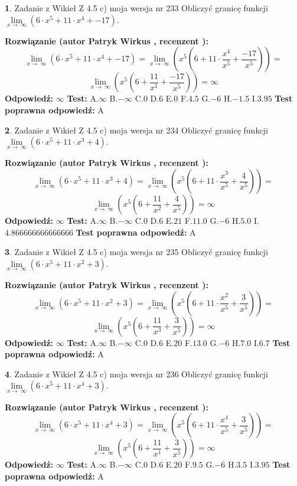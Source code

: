 \documentclass[12pt, a4paper]{article}
\theoremstyle{definition} %
\newtheorem{zad}{}
\newcommand{\zadStart}[1]{\begin{zad}#1\newline}
\newcommand{\zadStop}{\end{zad}}
\newcommand{\rozwStart}[2]{\noindent \textbf{Rozwiązanie (autor #1 , recenzent #2): }\newline}
\newcommand{\rozwStop}{\newline}
\newcommand{\odpStart}{\noindent \textbf{Odpowiedź:}\newline}
\newcommand{\odpStop}{\newline}
\newcommand{\testStart}{\noindent \textbf{Test:}\newline}
\newcommand{\testStop}{\newline}
\newcommand{\kluczStart}{\noindent \textbf{Test poprawna odpowiedź:}\newline}
\newcommand{\kluczStop}{\newline}
\begin{document}
\zadStart{Zadanie z Wikieł Z 4.5 c) moja wersja nr 233}
Obliczyć granicę funkcji  $\lim\limits_{x\to\ \infty}(6 \cdot x^{5}+11 \cdot x^{4}+-17)$.
\zadStop
\rozwStart{Patryk Wirkus}{}
$$\lim\limits_{x\to\ \infty}(6 \cdot x^{5}+11 \cdot x^{4}+-17) = \lim\limits_{x\to\ \infty}(x^{5}(6 +11 \cdot \frac{x^{4}}{x^{5}}+\frac{-17}{x^{5}})) =$$ $$\lim\limits_{x\to\ \infty}(x^{5}(6 +\frac{11}{x^{1}}+\frac{-17}{x^{5}})) =\infty$$
\rozwStop
\odpStart
$\infty$
\odpStop
\testStart
A.$\infty$ B.$-\infty$ C.$0$ D.$6$ E.$0$
F.$4.5$ G.$-6$
H.$-1.5$
I.$3.95$
\testStop
\kluczStart
A
\kluczStop



\zadStart{Zadanie z Wikieł Z 4.5 c) moja wersja nr 234}
Obliczyć granicę funkcji  $\lim\limits_{x\to\ \infty}(6 \cdot x^{5}+11 \cdot x^{3}+4)$.
\zadStop
\rozwStart{Patryk Wirkus}{}
$$\lim\limits_{x\to\ \infty}(6 \cdot x^{5}+11 \cdot x^{3}+4) = \lim\limits_{x\to\ \infty}(x^{5}(6 +11 \cdot \frac{x^{3}}{x^{5}}+\frac{4}{x^{5}})) =$$ $$\lim\limits_{x\to\ \infty}(x^{5}(6 +\frac{11}{x^{2}}+\frac{4}{x^{5}})) =\infty$$
\rozwStop
\odpStart
$\infty$
\odpStop
\testStart
A.$\infty$ B.$-\infty$ C.$0$ D.$6$ E.$21$
F.$11.0$ G.$-6$
H.$5.0$
I.$4.866666666666666$
\testStop
\kluczStart
A
\kluczStop



\zadStart{Zadanie z Wikieł Z 4.5 c) moja wersja nr 235}
Obliczyć granicę funkcji  $\lim\limits_{x\to\ \infty}(6 \cdot x^{5}+11 \cdot x^{2}+3)$.
\zadStop
\rozwStart{Patryk Wirkus}{}
$$\lim\limits_{x\to\ \infty}(6 \cdot x^{5}+11 \cdot x^{2}+3) = \lim\limits_{x\to\ \infty}(x^{5}(6 +11 \cdot \frac{x^{2}}{x^{5}}+\frac{3}{x^{5}})) =$$ $$\lim\limits_{x\to\ \infty}(x^{5}(6 +\frac{11}{x^{3}}+\frac{3}{x^{5}})) =\infty$$
\rozwStop
\odpStart
$\infty$
\odpStop
\testStart
A.$\infty$ B.$-\infty$ C.$0$ D.$6$ E.$20$
F.$13.0$ G.$-6$
H.$7.0$
I.$6.7$
\testStop
\kluczStart
A
\kluczStop



\zadStart{Zadanie z Wikieł Z 4.5 c) moja wersja nr 236}
Obliczyć granicę funkcji  $\lim\limits_{x\to\ \infty}(6 \cdot x^{5}+11 \cdot x^{4}+3)$.
\zadStop
\rozwStart{Patryk Wirkus}{}
$$\lim\limits_{x\to\ \infty}(6 \cdot x^{5}+11 \cdot x^{4}+3) = \lim\limits_{x\to\ \infty}(x^{5}(6 +11 \cdot \frac{x^{4}}{x^{5}}+\frac{3}{x^{5}})) =$$ $$\lim\limits_{x\to\ \infty}(x^{5}(6 +\frac{11}{x^{1}}+\frac{3}{x^{5}})) =\infty$$
\rozwStop
\odpStart
$\infty$
\odpStop
\testStart
A.$\infty$ B.$-\infty$ C.$0$ D.$6$ E.$20$
F.$9.5$ G.$-6$
H.$3.5$
I.$3.95$
\testStop
\kluczStart
A
\kluczStop
\end{document}
